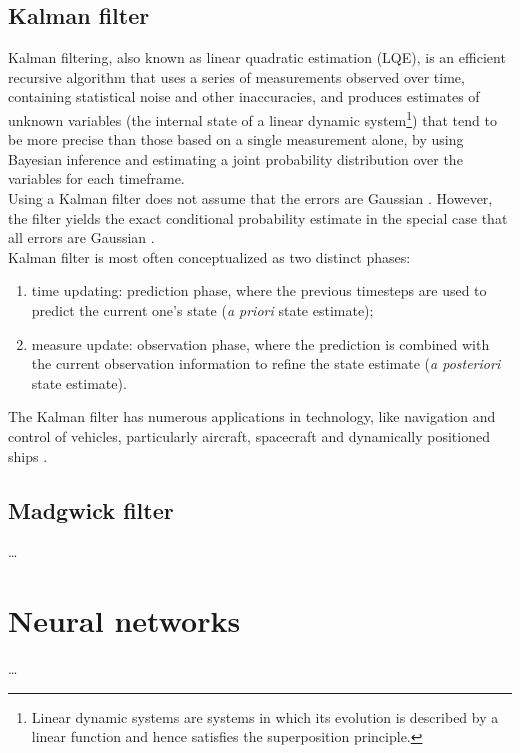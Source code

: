 \subsection{Kalman filter}
Kalman filtering, also known as linear quadratic estimation (LQE), is an efficient recursive algorithm that uses a series of measurements observed over time, containing statistical noise and other inaccuracies, and produces estimates of unknown variables (the internal state of a linear dynamic system\footnote{Linear dynamic systems are systems in which its evolution is described by a linear function and hence satisfies the superposition principle.}) that tend to be more precise than those based on a single measurement alone, by using Bayesian inference and estimating a joint probability distribution over the variables for each timeframe.\\
Using a Kalman filter does not assume that the errors are Gaussian \cite{Kal60}. However, the filter yields the exact conditional probability estimate in the special case that all errors are Gaussian \cite{WikipediaKalman}.\\
Kalman filter is most often conceptualized as two distinct phases:

\begin{enumerate}
	\item time updating: prediction phase, where the previous timesteps are used to predict the current one's state (\textit{a priori} state estimate);
	\item measure update: observation phase, where the prediction is combined with the current observation information to refine the state estimate (\textit{a posteriori} state estimate).
\end{enumerate}

The Kalman filter has numerous applications in technology, like navigation and control of vehicles, particularly aircraft, spacecraft and dynamically positioned ships \cite{WikipediaKalman}.

\subsection{Madgwick filter} \label{Madgwick filter}
\dots

\section{Neural networks}
\dots
